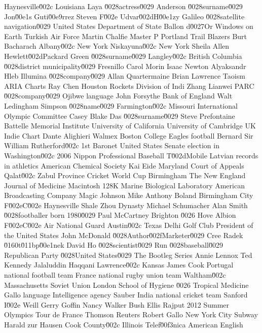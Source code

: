 Haynesville\u002c Louisiana  Laya \u0028actress\u0029  Anderson \u0028surname\u0029  
Jon\u00e1s Guti\u00e9rrez  Steven F\u002e Udvar\u002dH\u00e1zy  Galileo \u0028satellite navigation\u0029  
United States Department of State  Ballon d\u0027Or  Windows on Earth  
Turkish Air Force  Martin Chalfie  Master P  
Portland Trail Blazers  Burt Bacharach  Albany\u002c New York  
Niskayuna\u002c New York  Sheila Allen  Hewlett\u002dPackard  
Green \u0028surname\u0029  Langley\u002c British Columbia \u0028district municipality\u0029  Fresnillo  
Carol Morin  Isaac Newton  Alyaksandr Hleb  
Illumina \u0028company\u0029  Allan Quartermaine  Brian Lawrence  
Taoism  ARIA Charts  Ray Chen  
Houston Rockets  Division of Indi  Zhang Lianwei  
PARC \u0028company\u0029  Ojibwe language  John Forsythe  
Bank of England  Walt Ledingham  Simpson \u0028name\u0029  
Farmington\u002c Missouri  International Olympic Committee  Casey Blake  
Das \u0028surname\u0029  Steve Prefontaine  Battelle Memorial Institute  
University of California  University of Cambridge  UK Indie Chart  
Dante Alighieri  Walmex  Boston College Eagles football  
Bernard  Sir William Rutherford\u002c 1st Baronet  United States Senate election in Washington\u002c 2006  
Nippon Professional Baseball  T\u002dMobile  Latvian records in athletics  
American Chemical Society  Kai Eide  Maryland Court of Appeals  
Qalat\u002c Zabul Province  Cricket World Cup  Birmingham  
The New England Journal of Medicine  Macintosh 128K  Marine Biological Laboratory  
American Broadcasting Company  Magic Johnson  Mike Anthony Boland  
Birmingham City F\u002eC\u002e  Haynesville Shale  Zhou Dynasty  
Michael Schumacher  Alan Smith \u0028footballer born 1980\u0029  Paul McCartney  
Brighton \u0026 Hove Albion F\u002eC\u002e  Air National Guard  Austin\u002c Texas  
Delhi Golf Club  President of the United States  John McDonald \u0028Author\u002fMarketer\u0029  
Cree  Radek \u0160t\u011bp\u00e1nek  David Ho \u0028scientist\u0029  
Run \u0028baseball\u0029  Republican Party \u0028United States\u0029  The Bootleg Series  
Annie Lennox  Ted Kennedy  Jalaluddin Haqqani  
Lawrence\u002c Kansas  James Cook  Portugal national football team  
France national rugby union team  Waltham\u002c Massachusetts  Soviet Union  
London School of Hygiene \u0026 Tropical Medicine  Gallo language  Intelligence agency  
Sauber  India national cricket team  Sanford I\u002e Weill  
Gerry Goffin  Nancy Walker Bush Ellis  Rajput  
2012 Summer Olympics  Tour de France  Thomson Reuters  
Robert Gallo  New York City Subway  Harald zur Hausen  
Cook County\u002c Illinois  Telef\u00f3nica  American English  
